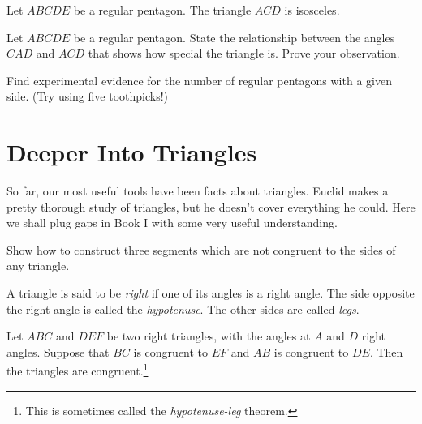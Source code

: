 \begin{conjecture}\label{conj:regular-pentagon-central-triangle}
Let $ABCDE$ be a regular pentagon. The triangle $ACD$ is isosceles.
\end{conjecture}

\begin{problem}\label{prob:reg-pentagon-angles}
Let $ABCDE$ be a regular pentagon. State the relationship between the angles $CAD$ and $ACD$ that shows how special the triangle is. Prove your observation.
\end{problem}

\begin{problem}\label{prob:reg-pentagon-types}
Find experimental evidence for the number of regular pentagons with a given side. (Try using five toothpicks!)\\[.1in]
\end{problem}




\chapter{Deeper Into Triangles}

So far, our most useful tools have been facts about triangles. Euclid makes a pretty thorough study of triangles, but he doesn't cover everything he could. 
Here we shall plug  gaps in Book I with some very useful understanding.

\begin{problem}
\label{prob:triangle-inequality}
Show how to construct three segments which are not congruent to the sides of any triangle.
\end{problem}


\begin{definition}
\label{defn:right-triangles}
A triangle is said to be \emph{right} if one of its angles is a right angle. 
The side opposite the right angle is called the \emph{hypotenuse}. 
The other sides are called \emph{legs}.
\end{definition}

\begin{conjecture}
\label{conj:RASS}
Let $ABC$ and $DEF$ be two right triangles, with the angles at $A$ and $D$ right angles. 
Suppose that $BC$ is congruent to $EF$ and $AB$ is congruent to $DE$. 
Then the triangles are congruent.\footnote{This is sometimes called the \emph{hypotenuse-leg} theorem.}
\end{conjecture}

